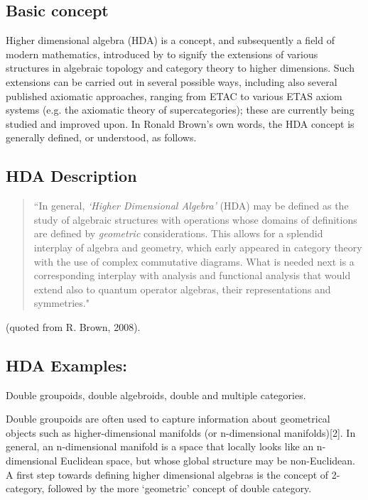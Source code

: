 \documentclass[12pt]{article}
\theoremstyle{plain}
\theoremstyle{definition}
\numberwithin{equation}{section}
\newcommand{\<}{{\langle}}
\begin{document}
\subsection{Basic concept} 
Higher dimensional algebra (HDA) is a concept, and subsequently a field of modern mathematics, introduced by 
 to signify the extensions of various structures in algebraic topology and category theory to higher dimensions. Such extensions can be carried out in several possible ways, including also several published axiomatic approaches, ranging from ETAC to various ETAS axiom systems (e.g. the axiomatic theory of supercategories); these are currently being studied and improved upon. In Ronald Brown's own words, the HDA concept is generally defined, or understood, as follows.

\subsection{HDA Description} 
 
\begin{quote}
``In general, \textit{`Higher Dimensional Algebra'} (HDA) may be defined as the study of algebraic
structures with operations whose domains of definitions are defined by {\em geometric} considerations. This allows for a splendid interplay of algebra and geometry, which early appeared in category theory with the use of complex commutative diagrams. What is needed next is a corresponding interplay with analysis and functional analysis that would extend also to quantum operator algebras, their representations and symmetries."
\end{quote}

(quoted from R. Brown, 2008).

\subsection{HDA Examples:}  Double groupoids, double algebroids, double and multiple categories. 

Double groupoids are often used to capture information about geometrical objects such as higher-dimensional manifolds (or n-dimensional manifolds)[2]. In general, an n-dimensional manifold is a space that locally looks like an n-dimensional Euclidean space, but whose global structure may be non-Euclidean. A first step towards defining higher dimensional algebras is the concept of 2-category, followed by the more `geometric' concept of double category.
\end{document}
